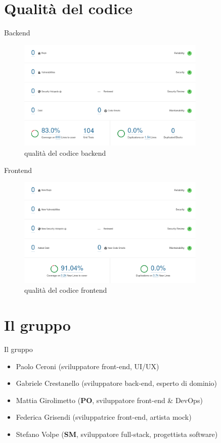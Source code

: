 \documentclass{beamer}
\begin{document}
\section{Qualit\`a del codice}
\begin{frame}{Backend}
	\begin{figure}
		\includegraphics[width=0.8\textwidth]{quality-backend-overall}
		\caption{qualit\`a del codice backend}
	\end{figure}
\end{frame}

\begin{frame}{Frontend}
	\begin{figure}
		\includegraphics[width=0.8\textwidth]{quality-frontend-overall}
		\caption{qualit\`a del codice frontend}
	\end{figure}
\end{frame}

\section{Il gruppo}
\begin{frame}{Il gruppo}
	\begin{itemize}
		\item Paolo Ceroni (sviluppatore front-end, UI/UX)
		\item Gabriele Crestanello (sviluppatore back-end, esperto di dominio)
		\item Mattia Girolimetto (\textbf{PO}, sviluppatore front-end \& DevOps)
		\item Federica Grisendi (sviluppatrice front-end, artista mock)
		\item Stefano Volpe (\textbf{SM}, sviluppatore full-stack, progettista software)
	\end{itemize}
\end{frame}
\end{document}
